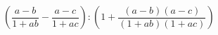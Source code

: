 \begin{ex}[type=expression]
	\begin{condition}
		\(\left( \dfrac{a-b}{1+ab}-\dfrac{a-c}{1+ac} \right):\left( 1+\dfrac{(a-b)(a-c)}{(1+ab)(1+ac)} \right)\)
	\end{condition}
\end{ex}